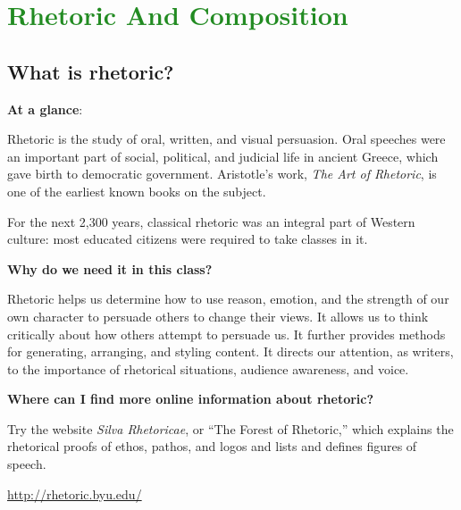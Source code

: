 
\section{\textcolor{ForestGreen}{Rhetoric And Composition}}


\subsection{What is rhetoric?}

\textbf{At a glance}: 

Rhetoric is the study of oral, written, and visual persuasion. Oral speeches were an important part of social, political, and judicial life in ancient Greece, which gave birth to democratic government. Aristotle's work, \emph{The Art of Rhetoric}, is one of the earliest known books on the subject.

 
For the next 2,300 years, classical rhetoric was an integral part of Western culture: most educated citizens were required to take classes in it.
 
\textbf{Why do we need it in this class?} 

Rhetoric helps us determine how to use reason, emotion, and the strength of our own character to persuade others to change their views. It allows us to think critically about how others attempt to persuade us. It further provides methods for generating, arranging, and styling content. It directs our attention, as writers, to the importance of rhetorical situations, audience awareness, and voice.

\textbf{Where can I find more online information about rhetoric?}

Try the website \emph{Silva Rhetoricae}, or ``The Forest of Rhetoric,'' which explains the rhetorical proofs of ethos, pathos, and logos and lists and defines figures of speech.

\url{http://rhetoric.byu.edu/} 

